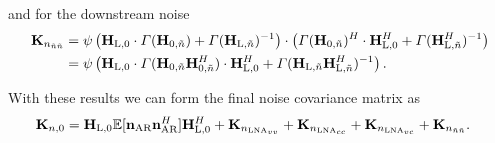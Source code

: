 and for the downstream noise
\begin{align}
\nonumber
\mathbf{K}_{n_{\tilde{n}\tilde{n}}}
&=\psi\left(\mathbf{H}_\text{L,0}\cdot\Gamma(\mathbf{H}_{0,\tilde{n}})+
	\Gamma(\mathbf{H}_{\text{L},\tilde{n}})^{-1}\right)\cdot
\left(\Gamma(\mathbf{H}_{\text{0},\tilde{n}})^H\cdot\mathbf{H}_\text{L,0}^H+
	\Gamma(\mathbf{H}_{\text{L},\tilde{n}}^H)^{-1}\right)\\
&=\psi\left(\mathbf{H}_\text{L,0}\cdot\Gamma(\mathbf{H}_{\text{0},\tilde{n}}
	\mathbf{H}_{\text{0},\tilde{n}}^H)\cdot\mathbf{H}_{\text{L},0}^H + 
	\Gamma(\mathbf{H}_{\text{L},\tilde{n}}\mathbf{H}_{\text{L},\tilde{n}}^H)^{-1}\right).
\end{align}

With these results we can form the final noise covariance matrix as 
\begin{align}
\label{eq:noise_cov}
\mat{K}_{n,0}&= %
\mat{H}_\text{L,0}\mathbb{E}[\vec{n}_\text{AR}\vec{n}_\text{AR}^H]\mat{H}_\text{L,0}^H +
\mat{K}_{n_{\text{LNA}_{vv}}}+
\mat{K}_{n_{\text{LNA}_{cc}}}+
\mat{K}_{n_{\text{LNA}_{vc}}}+
\mat{K}_{n_{\tilde{n}\tilde{n}}}.
\end{align}










